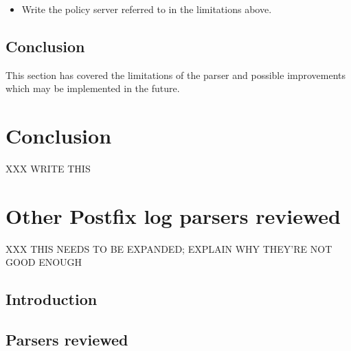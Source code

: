 \documentclass[a4paper,12pt,draft]{article}
\begin{document}
\begin{itemize}

    \item Write the policy server referred to in the limitations above.

\end{itemize}

\subsection{Conclusion}

This section has covered the limitations of the parser and possible
improvements which may be implemented in the future.

\section{Conclusion}

\label{conclusion}

XXX WRITE THIS


\appendix


\section{Other Postfix log parsers reviewed}

XXX THIS NEEDS TO BE EXPANDED\@; EXPLAIN WHY THEY'RE NOT GOOD ENOUGH

\label{other-parsers}

\subsection{Introduction}

\subsection{Parsers reviewed}
\end{document}
